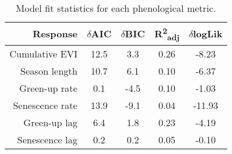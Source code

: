 \begin{table}[H]
\centering
\begin{tabular}{rcccc}
  \hline
Response & $\delta$AIC & $\delta$BIC & R\textsuperscript{2}\textsubscript{adj} & $\delta$logLik \\ 
  \hline
Cumulative EVI & 12.5 & 3.3 & 0.26 & -8.23 \\ 
  Season length & 10.7 & 6.1 & 0.10 & -6.37 \\ 
  Green-up rate & 0.1 & -4.5 & 0.10 & -1.03 \\ 
  Senescence rate & 13.9 & -9.1 & 0.04 & -11.93 \\ 
  Green-up lag & 6.4 & 1.8 & 0.23 & -4.19 \\ 
  Senescence lag & 0.2 & 0.2 & 0.05 & -0.10 \\ 
   \hline
\end{tabular}
\caption{Model fit statistics for each phenological metric.} 
\label{mod_stat}
\end{table}

